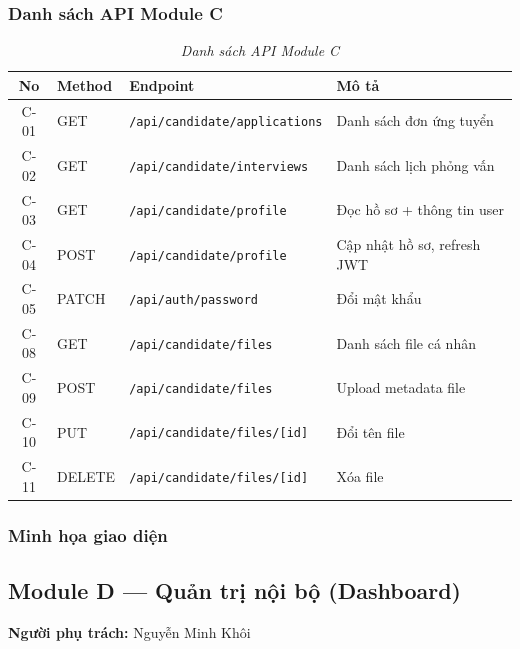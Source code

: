 \subsubsection*{Danh sách API Module C}
\begin{table}[H]
    \centering
    \renewcommand{\arraystretch}{1.3}
    \begin{tabular}{|c|l|l|l|}
        \hline
        \textbf{No} & \textbf{Method} & \textbf{Endpoint} & \textbf{Mô tả} \\ \hline
        C-01 & GET & \texttt{/api/candidate/applications} & Danh sách đơn ứng tuyển \\ \hline
        C-02 & GET & \texttt{/api/candidate/interviews} & Danh sách lịch phỏng vấn \\ \hline
        C-03 & GET & \texttt{/api/candidate/profile} & Đọc hồ sơ + thông tin user \\ \hline
        C-04 & POST & \texttt{/api/candidate/profile} & Cập nhật hồ sơ, refresh JWT \\ \hline
        C-05 & PATCH & \texttt{/api/auth/password} & Đổi mật khẩu \\ \hline
        C-08 & GET & \texttt{/api/candidate/files} & Danh sách file cá nhân \\ \hline
        C-09 & POST & \texttt{/api/candidate/files} & Upload metadata file \\ \hline
        C-10 & PUT & \texttt{/api/candidate/files/[id]} & Đổi tên file \\ \hline
        C-11 & DELETE & \texttt{/api/candidate/files/[id]} & Xóa file \\ \hline
    \end{tabular}
    \caption{\textit{Danh sách API Module C}}
\end{table}

\subsubsection*{Minh họa giao diện}

\subsection{Module D --- Quản trị nội bộ (Dashboard)}
\textbf{Người phụ trách:} Nguyễn Minh Khôi

